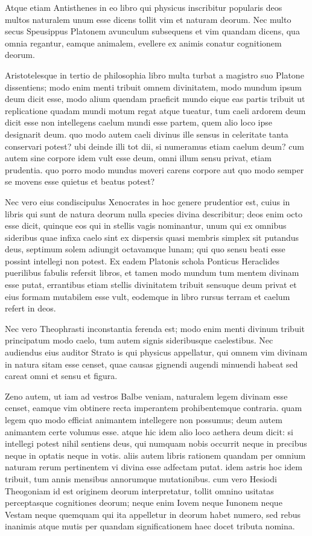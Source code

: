  Atque etiam Antisthenes in eo libro qui physicus inscribitur popularis deos multos naturalem unum esse dicens tollit vim et naturam deorum. Nec multo secus Speusippus Platonem avunculum subsequens et vim quandam dicens, qua omnia regantur, eamque animalem, evellere ex animis conatur cognitionem deorum.

 Aristotelesque in tertio de philosophia libro multa turbat a magistro suo Platone dissentiens; modo enim menti tribuit omnem divinitatem, modo mundum ipsum deum dicit esse, modo alium quendam praeficit mundo eique eas partis tribuit ut replicatione quadam mundi motum regat atque tueatur, tum caeli ardorem deum dicit esse non intellegens caelum mundi esse partem, quem alio loco ipse designarit deum. quo modo autem caeli divinus ille sensus in celeritate tanta conservari potest? ubi deinde illi tot dii, si numeramus etiam caelum deum? cum autem sine corpore idem vult esse deum, omni illum sensu privat, etiam prudentia. quo porro modo mundus moveri carens corpore aut quo modo semper se movens esse quietus et beatus potest?

 Nec vero eius condiscipulus Xenocrates in hoc genere prudentior est, cuius in libris qui sunt de natura deorum nulla species divina describitur; deos enim octo esse dicit, quinque eos qui in stellis vagis nominantur, unum qui ex omnibus sideribus quae infixa caelo sint ex dispersis quasi membris simplex sit putandus deus, septimum solem adiungit octavamque lunam; qui quo sensu beati esse possint intellegi non potest. Ex eadem Platonis schola Ponticus Heraclides puerilibus fabulis refersit libros, et tamen modo mundum tum mentem divinam esse putat, errantibus etiam stellis divinitatem tribuit sensuque deum privat et eius formam mutabilem esse vult, eodemque in libro rursus terram et caelum refert in deos.

 Nec vero Theophrasti inconstantia ferenda est; modo enim menti divinum tribuit principatum modo caelo, tum autem signis sideribusque caelestibus. Nec audiendus eius auditor Strato is qui physicus appellatur, qui omnem vim divinam in natura sitam esse censet, quae causas gignendi augendi minuendi habeat sed careat omni et sensu et figura.

 Zeno autem, ut iam ad vestros Balbe veniam, naturalem legem divinam esse censet, eamque vim obtinere recta imperantem prohibentemque contraria. quam legem quo modo efficiat animantem intellegere non possumus; deum autem animantem certe volumus esse. atque hic idem alio loco aethera deum dicit: si intellegi potest nihil sentiens deus, qui numquam nobis occurrit neque in precibus neque in optatis neque in votis. aliis autem libris rationem quandam per omnium naturam rerum pertinentem vi divina esse adfectam putat. idem astris hoc idem tribuit, tum annis mensibus annorumque mutationibus. cum vero Hesiodi Theogoniam id est originem deorum interpretatur, tollit omnino usitatas perceptasque cognitiones deorum; neque enim Iovem neque Iunonem neque Vestam neque quemquam qui ita appelletur in deorum habet numero, sed rebus inanimis atque mutis per quandam significationem haec docet tributa nomina.

